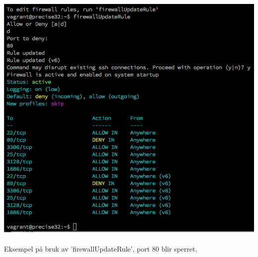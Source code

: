 \documentclass{article}
\begin{document}
\\ \\ 
\includegraphics[scale =0.7]{firewallUpdate.png}
\\ \\
Eksempel på bruk av 'firewallUpdateRule', port 80 blir sperret.
\end{document}
